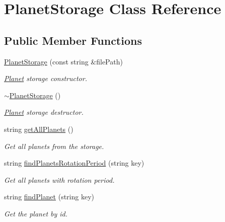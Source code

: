\hypertarget{class_planet_storage}{}\section{Planet\+Storage Class Reference}
\label{class_planet_storage}
\subsection*{Public Member Functions}
\begin{DoxyCompactItemize}
\item 
\hyperlink{class_planet_storage_ad42e4909863d4871afd6f885b13229fa}{Planet\+Storage} (const string \&file\+Path)
\begin{DoxyCompactList}\small\item\em \hyperlink{class_planet}{Planet} storage constructor. \end{DoxyCompactList}\item 
\mbox{\label{class_planet_storage_ab76b5b9444c7c9ad8a8deb643625a909}} 
\hyperlink{class_planet_storage_ab76b5b9444c7c9ad8a8deb643625a909}{$\sim$\+Planet\+Storage} ()
\begin{DoxyCompactList}\small\item\em \hyperlink{class_planet}{Planet} storage destructor. \end{DoxyCompactList}\item 
string \hyperlink{class_planet_storage_a828ae9655a5c71d38704baab36526796}{get\+All\+Planets} ()
\begin{DoxyCompactList}\small\item\em Get all planets from the storage. \end{DoxyCompactList}\item 
string \hyperlink{class_planet_storage_af07459737c01ceca06a5f909d618fac1}{find\+Planets\+Rotation\+Period} (string key)
\begin{DoxyCompactList}\small\item\em Get all planets with rotation period. \end{DoxyCompactList}\item 
string \hyperlink{class_planet_storage_a0fbb2ebb8a2426b21a4f46fcffeefc10}{find\+Planet} (string key)
\begin{DoxyCompactList}\small\item\em Get the planet by id. \end{DoxyCompactList}\end{DoxyCompactItemize}



